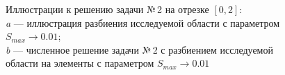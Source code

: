 \documentclass[12pt, a4paper]{article}
\begin{document}
\begin{figure}[h]
\begin{center}
				\end{center} 
				\vspace*{-0.0mm} 
				\caption{Иллюстрации к решению задачи №\,2 на отрезке $\left[ 0, 2 \right]$:\\
					\textit{a} --- иллюстрация разбиения исследуемой области с параметром $S_{max} \rightarrow 0.01$; \\
					\textit{b} --- численное решение задачи №\,2 с разбиением исследуемой области на  элементы с параметром $S_{max} \rightarrow 0.01$ \\
				} 
			\end{figure}
			
			
			
						
			\newpage
			
\end{document}
